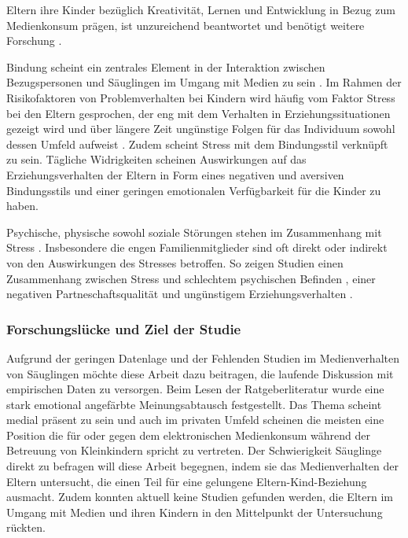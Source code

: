 Eltern ihre Kinder bezüglich Kreativität, Lernen und Entwicklung in Bezug zum Medienkonsum prägen, ist unzureichend beantwortet und benötigt weitere Forschung \cite{AmericanAcademyofPediatrics2011,Troseth2016}. 

Bindung scheint ein zentrales Element in der Interaktion zwischen Bezugspersonen und Säuglingen im Umgang mit Medien zu sein \cite{Prekop2017, Huether2017, Blikk2017}. Im Rahmen der Risikofaktoren von Problemverhalten bei Kindern wird häufig vom Faktor Stress bei den Eltern gesprochen, der eng mit dem Verhalten in Erziehungssituationen gezeigt wird und über längere Zeit ungünstige Folgen für das Individuum sowohl dessen Umfeld aufweist \cite{Cina2009}. Zudem scheint Stress mit dem Bindungsstil verknüpft zu sein. Tägliche Widrigkeiten scheinen Auswirkungen auf das Erziehungsverhalten der Eltern in Form eines negativen und aversiven Bindungsstils \cite{Dumas1989, Webster-Stratton1988} und einer geringen emotionalen Verfügbarkeit für die Kinder \cite{Campbell1991} zu haben. 

Psychische, physische sowohl soziale Störungen stehen im Zusammenhang mit Stress \cite{Elfering2002, Burisch1994}. Insbesondere die engen Familienmitglieder sind oft direkt oder indirekt von den Auswirkungen des Stresses betroffen. So zeigen Studien einen Zusammenhang zwischen Stress und schlechtem psychischen Befinden \cite{Burisch1994, Krohne1997}, einer negativen Partneschaftsqualität \cite{Bodenmann2000, Bodenmann1999, Bodenmann2000a} und ungünstigem Erziehungsverhalten \cite{Abidin1992, Belsky1984, WebsterStratton2000}.

\subsubsection{Forschungslücke und Ziel der Studie}
Aufgrund der geringen Datenlage und der Fehlenden Studien im Medienverhalten von Säuglingen möchte diese Arbeit dazu beitragen, die laufende Diskussion mit empirischen Daten zu versorgen. Beim Lesen der Ratgeberliteratur wurde eine stark emotional angefärbte Meinungsabtausch festgestellt. Das Thema scheint medial präsent zu sein und auch im privaten Umfeld scheinen die meisten eine Position die für oder gegen dem elektronischen Medienkonsum während der Betreuung von Kleinkindern spricht zu vertreten. Der Schwierigkeit Säuglinge direkt zu befragen will diese Arbeit begegnen, indem sie das Medienverhalten der Eltern untersucht, die einen Teil für eine gelungene Eltern-Kind-Beziehung ausmacht. Zudem konnten aktuell keine Studien gefunden werden, die Eltern im Umgang mit Medien und ihren Kindern in den Mittelpunkt der Untersuchung rückten.  

